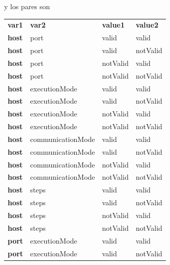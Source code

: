 y los pares son

\begin{table}[H]
    \small
    \begin{tabular}{llll}
        \textbf{var1}          & \textbf{var2}     & \textbf{value1} & \textbf{value2} \\
        \textbf{host}          & port              & valid           & valid           \\
        \textbf{host}          & port              & valid           & notValid        \\
        \textbf{host}          & port              & notValid        & valid           \\
        \textbf{host}          & port              & notValid        & notValid        \\
        \textbf{host}          & executionMode     & valid           & valid           \\
        \textbf{host}          & executionMode     & valid           & notValid        \\
        \textbf{host}          & executionMode     & notValid        & valid           \\
        \textbf{host}          & executionMode     & notValid        & notValid        \\
        \textbf{host}          & communicationMode & valid           & valid           \\
        \textbf{host}          & communicationMode & valid           & notValid        \\
        \textbf{host}          & communicationMode & notValid        & valid           \\
        \textbf{host}          & communicationMode & notValid        & notValid        \\
        \textbf{host}          & steps             & valid           & valid           \\
        \textbf{host}          & steps             & valid           & notValid        \\
        \textbf{host}          & steps             & notValid        & valid           \\
        \textbf{host}          & steps             & notValid        & notValid        \\
        \textbf{port}          & executionMode     & valid           & valid           \\
        \textbf{port}          & executionMode     & valid           & notValid        \\

\end{tabular}
\end{table}
